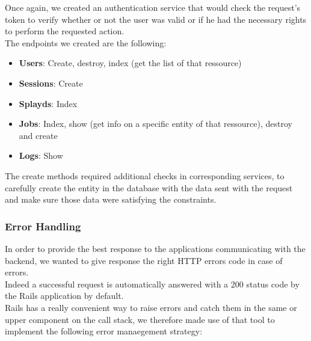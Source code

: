 \documentclass{eplmastersthesis}
\begin{document}
          Once again, we created an authentication service that would check
          the request's token to verify whether or not the user was valid or
          if he had the necessary rights to perform the requested action.\\

          The endpoints we created are the following:

          \begin{itemize}
            \item \textbf{Users}: Create, destroy, index (get the list of that
            ressource)
            \item \textbf{Sessions}: Create
            \item \textbf{Splayds}: Index
            \item \textbf{Jobs}: Index, show (get info on a specific entity
            of that ressource), destroy and create
            \item \textbf{Logs}: Show
          \end{itemize}

          The create methods required additional checks in corresponding
          services, to carefully create the entity in the database with
          the data sent with the request and make sure those data were
          satisfying the constraints.\\

        \subsubsection{Error Handling}

          In order to provide the best response to the applications
          communicating with the backend, we wanted to give response
          the right HTTP errors code in case of errors.\\

          Indeed a successful request is automatically answered with a 200
          status code by the Rails application by default.\\
          Rails has a really convenient way to raise errors and catch them
          in the same or upper component on the call stack, we therefore
          made use of that tool to implement the following error manaegement
          strategy:
\end{document}
